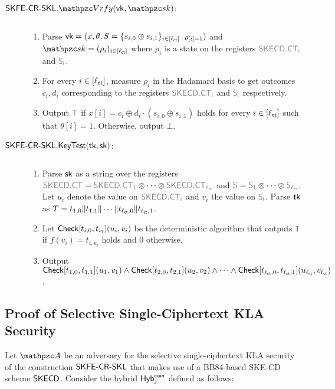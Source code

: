 \begin{description}
\item[$\SKFESKL.\qVrfy(\vk,\qsk)$:] $ $
\begin{enumerate}
\item Parse $\vk = (x,\theta,S=\{s_{i,0} \xor
    s_{i,1}\}_{i\in[\ctlen]\; : \; \theta[i]=1})$ and
    $\qsk = (\rho_i)_{i\in[\ctlen]}$ where $\rho_i$ is a state on
    the registers $\qreg{SKECD.CT_i}$ and $\qreg{S_i}$.
\item For every $i \in [\ctlen]$, measure $\rho_i$ in the Hadamard
basis to get outcomes $c_i, d_i$ corresponding to 
the registers $\qreg{SKECD.CT_i}$ and $\qreg{S_i}$ respectively.

\item Output $\top$ if $x[i]=c_i \oplus d_i\cdot(s_{i,0}\oplus
        s_{i,1})$ holds for every $i\in[\ctlen]$ such that $\theta[i]=1$.
    Otherwise, output $\bot$.
\end{enumerate}

\item[$\SKFESKL.\KeyTest(\tk,\sk)$:] $ $
\begin{enumerate}
\item Parse $\sk$ as a string over the registers
$\qreg{SKECD.CT} = \qreg{SKECD.CT_1} \otimes \cdots \otimes
\qreg{SKECD.CT_{\ctlen}}$ and $\qreg{S} = \qreg{S_1} \otimes
\cdots \otimes \qreg{S_{\ctlen}}$.
Let $u_i$ denote the value on
$\qreg{SKECD.CT_i}$ and $v_i$ the value on $\qreg{S_i}$. Parse $\tk$
as $T=t_{1,0}\|t_{1,1}\|\cdots \|t_{\ctlen,0}\|t_{\ctlen,1}$.


\item Let $\Check[t_{i,0},t_{i_1}](u_i,v_i)$ be the deterministic
algorithm that outputs $1$ if $f(v_i)=t_{i,u_i}$ holds and $0$
otherwise.

\item Output $\Check[t_{1,0},t_{1,1}](u_1,v_1) \land
\Check[t_{2,0},t_{2,1}](u_2,v_2) \land \cdots \land
\Check[t_{\ctlen,0},t_{\ctlen,1}](u_{\ctlen},v_{\ctlen})$.
\end{enumerate}

\end{description}

\subsection{Proof of Selective
Single-Ciphertext KLA Security}\label{proof:sel-1ct-kla}
Let $\qA$ be an adversary for the selective
single-ciphertext KLA security of the
construction $\SKFESKL$ that makes use of a BB84-based
SKE-CD scheme $\SKECD$. Consider the hybrid $\Hyb_j^\coin$ defined
as  follows:

